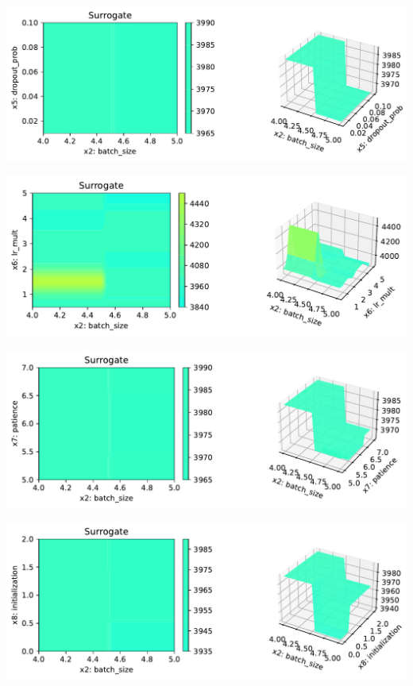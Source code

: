 \documentclass[
  letterpaper,
  DIV=11,
  numbers=noendperiod]{scrreprt}
\begin{document}
\includegraphics{031_spot_lightning_linear_diabetes_files/figure-pdf/cell-19-output-11.pdf}

\includegraphics{031_spot_lightning_linear_diabetes_files/figure-pdf/cell-19-output-12.pdf}

\includegraphics{031_spot_lightning_linear_diabetes_files/figure-pdf/cell-19-output-13.pdf}

\includegraphics{031_spot_lightning_linear_diabetes_files/figure-pdf/cell-19-output-14.pdf}
\end{document}
